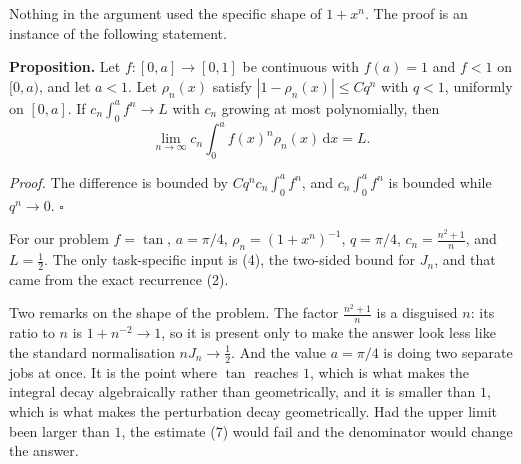 \documentclass[12pt]{article}
\newcommand{\dd}{\,\mathrm{d}}
\newcommand{\Jn}{J_n}
\begin{document}
Nothing in the argument used the specific shape of \(1+x^n\). The proof
is an instance of the following statement.

\textbf{Proposition.}
Let \(f:[0,a]\to[0,1]\) be continuous with \(f(a)=1\) and \(f<1\) on
\([0,a)\), and let \(a<1\). Let \(\rho_n(x)\) satisfy
\(|1-\rho_n(x)|\le C q^n\) with \(q<1\), uniformly on \([0,a]\). If
\(c_n\int_0^a f^n\to L\) with \(c_n\) growing at most polynomially, then
\[
\lim_{n\to\infty}c_n\int_0^a f(x)^n\rho_n(x)\dd x=L.
\]

\textit{Proof.} The difference is bounded by
\(Cq^n c_n\int_0^a f^n\), and \(c_n\int_0^a f^n\) is bounded while
\(q^n\to0\). \(\square\)

For our problem \(f=\tan\), \(a=\pi/4\), \(\rho_n=(1+x^n)^{-1}\),
\(q=\pi/4\), \(c_n=\frac{n^2+1}{n}\), and \(L=\frac12\). The only
task-specific input is (4), the two-sided bound for \(\Jn\), and that
came from the exact recurrence (2).

Two remarks on the shape of the problem. The factor \(\frac{n^2+1}{n}\)
is a disguised \(n\): its ratio to \(n\) is \(1+n^{-2}\to1\), so it is
present only to make the answer look less like the standard normalisation
\(n\Jn\to\frac12\). And the value \(a=\pi/4\) is doing two separate jobs
at once. It is the point where \(\tan\) reaches \(1\), which is what
makes the integral decay algebraically rather than geometrically, and it
is smaller than \(1\), which is what makes the perturbation decay
geometrically. Had the upper limit been larger than \(1\), the estimate
(7) would fail and the denominator would change the answer.
\end{document}
